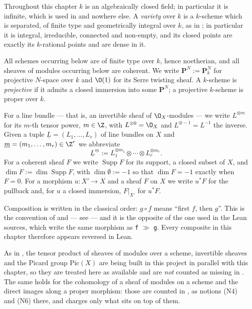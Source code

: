 Throughout this chapter $k$ is an algebraically closed field; in particular it
is infinite, which is used in  and nowhere
else.  A \emph{variety} over $k$ is a $k$-scheme which is separated, of finite
type and geometrically integral over $k$, as in
; in particular it is integral, irreducible,
connected and non-empty, and its closed points are exactly its $k$-rational
points and are dense in it.

All schemes occurring below are of finite type over $k$, hence noetherian, and
all sheaves of modules occurring below are coherent.  We write
$\mathbf P^N:=\mathbf P^N_k$ for projective $N$-space over $k$ and $\O(1)$ for
its Serre twisting sheaf.  A $k$-scheme is \emph{projective} if it admits a
closed immersion into some $\mathbf P^N$; a projective $k$-scheme is proper
over $k$.

For a line bundle --- that is, an invertible sheaf of $\O_X$-modules --- we
write $L^{\otimes m}$ for its $m$-th tensor power, $m\in\Z$, with
$L^{\otimes0}=\O_X$ and $L^{\otimes-1}=L^{-1}$ the inverse.  Given a tuple
$\underline L=(L_1,\dots,L_r)$ of line bundles on $X$ and
$\underline m=(m_1,\dots,m_r)\in\Z^r$ we abbreviate
\[
  \underline L^{\underline m}:=L_1^{\otimes m_1}\otimes\cdots\otimes
  L_r^{\otimes m_r}.
\]
For a coherent sheaf $F$ we write $\operatorname{Supp}F$ for its support, a
closed subset of $X$, and $\dim F:=\dim\operatorname{Supp}F$, with
$\dim\emptyset:=-1$ so that $\dim F=-1$ exactly when $F=0$.  For a morphism
$u\colon X'\to X$ and a sheaf $F$ on $X$ we write $u^*F$ for the pullback and,
for $u$ a closed immersion, $F|_{X'}$ for $u^*F$.

\begin{warning}\label{warn:deg-composition-order}
Composition is written in the classical order: $g\circ f$ means ``first $f$,
then $g$''.  This is the convention of  and
 --- see  --- and it is the
opposite of the one used in the Lean sources, which write the same morphism as
\texttt{f} $\gg$ \texttt{g}.  Every composite in this chapter therefore
appears reversed in Lean.
\end{warning}

\begin{warning}
\label{warn:deg-parallel-layer}
As in , the tensor product of sheaves of modules
over a scheme, invertible sheaves and the Picard group $\mathrm{Pic}(X)$ are
being built in this project in parallel with this chapter, so they are treated
here as available and are \emph{not} counted as missing in
.  The same holds for the cohomology of a sheaf of modules
on a scheme and the direct images along a proper morphism: those are counted in
, as notions (N4) and (N6) there, and
 charges only what sits on top of them.
\end{warning}

